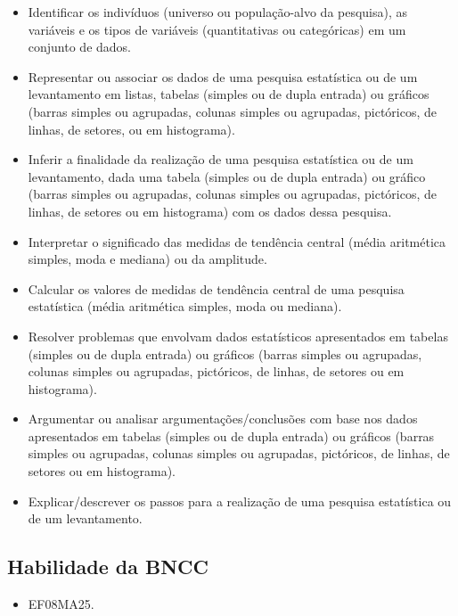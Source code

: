 {{\begin{itemize}
\item Identificar os indivíduos (universo ou
população-alvo da pesquisa), as variáveis e os tipos de variáveis
(quantitativas ou categóricas) em um conjunto de dados.
\item
  Representar ou associar os dados de uma pesquisa estatística ou de um
  levantamento em listas, tabelas (simples ou de dupla entrada) ou
  gráficos (barras simples ou agrupadas, colunas simples ou agrupadas,
  pictóricos, de linhas, de setores, ou em histograma).
\item
  Inferir a finalidade da realização de uma pesquisa estatística ou de
  um levantamento, dada uma tabela (simples ou de dupla entrada) ou
  gráfico (barras simples ou agrupadas, colunas simples ou agrupadas,
  pictóricos, de linhas, de setores ou em histograma) com os dados dessa
  pesquisa.
\item
  Interpretar o significado das medidas de tendência central (média
  aritmética simples, moda e mediana) ou da amplitude.
\item
  Calcular os valores de medidas de tendência central de uma pesquisa
  estatística (média aritmética simples, moda ou mediana).
\item
  Resolver problemas que envolvam dados estatísticos apresentados em
  tabelas (simples ou de dupla entrada) ou gráficos (barras simples ou
  agrupadas, colunas simples ou agrupadas, pictóricos, de linhas, de
  setores ou em histograma).
\item
  Argumentar ou analisar argumentações/conclusões com base nos dados
  apresentados em tabelas (simples ou de dupla entrada) ou gráficos
  (barras simples ou agrupadas, colunas simples ou agrupadas,
  pictóricos, de linhas, de setores ou em histograma).
\item
  Explicar/descrever os passos para a realização de uma pesquisa
  estatística ou de um levantamento.
\end{itemize}

\subsection{Habilidade da BNCC}

\begin{itemize}
\item EF08MA25.
\end{itemize}


}}
